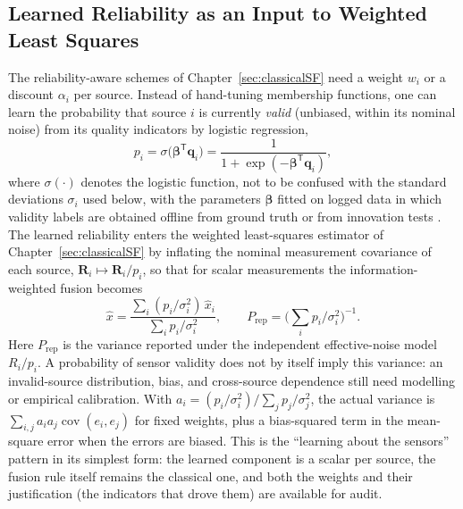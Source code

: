 \subsection{Learned Reliability as an Input to Weighted Least Squares}
\label{subsec:learned-reliability}
The reliability-aware schemes of Chapter~\ref{sec:classicalSF} need a weight $w_i$ or a discount $\alpha_i$ per source. Instead of hand-tuning membership functions, one can learn the probability that source $i$ is currently \emph{valid} (unbiased, within its nominal noise) from its quality indicators by logistic regression,
\begin{equation}
p_i=\sigma\!\big(\boldsymbol{\beta}^{\mathsf T}\mathbf{q}_i\big)=\frac{1}{1+\exp(-\boldsymbol{\beta}^{\mathsf T}\mathbf{q}_i)},
\label{eq:logistic-reliability}
\end{equation}
where $\sigma(\cdot)$ denotes the logistic function, not to be confused with the standard deviations $\sigma_i$ used below, with the parameters $\boldsymbol{\beta}$ fitted on logged data in which validity labels are obtained offline from ground truth or from innovation tests \cite{bishop2006_prml}. The learned reliability enters the weighted least-squares estimator of Chapter~\ref{sec:classicalSF} by inflating the nominal measurement covariance of each source, $\mathbf{R}_i\mapsto\mathbf{R}_i/p_i$, so that for scalar measurements the information-weighted fusion becomes
\begin{equation}
\widehat{x}=\frac{\sum_i (p_i/\sigma_i^{2})\,\widehat{x}_i}{\sum_i p_i/\sigma_i^{2}},\qquad
P_{\mathrm{rep}}=\Big(\sum_i p_i/\sigma_i^{2}\Big)^{-1}.
\label{eq:wls-reliability}
\end{equation}
Here $P_{\mathrm{rep}}$ is the variance reported under the independent effective-noise model $R_i/p_i$. A probability of sensor validity does not by itself imply this variance: an invalid-source distribution, bias, and cross-source dependence still need modelling or empirical calibration. With $a_i=(p_i/\sigma_i^2)/\sum_j p_j/\sigma_j^2$, the actual variance is $\sum_{i,j}a_i a_j\operatorname{cov}(e_i,e_j)$ for fixed weights, plus a bias-squared term in the mean-square error when the errors are biased. This is the ``learning about the sensors'' pattern in its simplest form: the learned component is a scalar per source, the fusion rule itself remains the classical one, and both the weights and their justification (the indicators that drove them) are available for audit.


